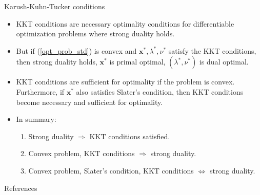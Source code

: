\documentclass{beamer}
\numberwithin{equation}{section}
\newcommand{\aref}[1]{\alert{\ref{#1}}}
\begin{document}
\begin{frame}{Karush-Kuhn-Tucker conditions}
    \begin{itemize}
        \item
        KKT conditions are \alert{necessary} optimality conditions for
        differentiable optimization problems where strong duality holds.

        \item
        But if (\aref{opt_prob_std}) is convex and $ \mathbf{x}^*, \lambda^*,
        \nu^* $ satisfy the KKT conditions, then strong duality holds,
        $ \mathbf{x}^* $ is primal optimal, $ (\lambda^*, \nu^*) $ is dual
        optimal.

        \item
        KKT conditions are \alert{sufficient} for optimality if the problem is
        convex. Furthermore, if $ \mathbf{x}^* $ also satisfies Slater's
        condition, then KKT conditions become \alert{necessary and sufficient}
        for optimality.

        \item
        In summary:
        \begin{enumerate}
            \item
            Strong duality $ \Rightarrow $ KKT conditions satisfied.

            \item
            Convex problem, KKT conditions $ \Rightarrow $ strong duality.

            \item
            Convex problem, Slater's condition, KKT conditions
            $ \Leftrightarrow $ strong duality.
        \end{enumerate}
    \end{itemize}
\end{frame}


\begin{frame}{References}
    
    
\end{frame}
\end{document}
